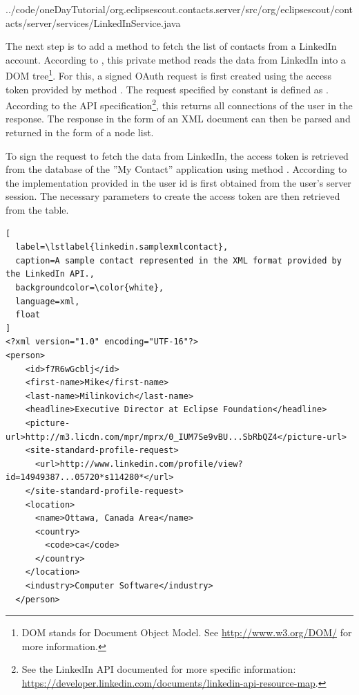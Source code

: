 \documentclass[a4paper,10pt,twoside]{book}
\begin{document}

{../code/oneDayTutorial/org.eclipsescout.contacts.server/src/org/eclipsescout/contacts/server/services/LinkedInService.java}

The next step is to add a method  to fetch the list of contacts from a LinkedIn account. 
According to , this private  method reads the data from LinkedIn into a DOM tree\footnote{
DOM stands for Document Object Model. See \url{http://www.w3.org/DOM/} for more information.
}. 
For this, a signed OAuth request is first created using the access token provided by method . 
The request specified by constant  is defined as . 
According to the API specification\footnote{
See the LinkedIn API documented for more specific information: \url{https://developer.linkedin.com/documents/linkedin-api-resource-map}.
}, 
this returns all connections of the user in the response. 
The response in the form of an XML document can then be parsed and returned in the form of a node list. 

To sign the request to fetch the data from LinkedIn, the access token is retrieved from the database of the ''My Contact'' application using method . 
According to the implementation provided in  the user id is first obtained from the user's server session. 
The necessary parameters to create the access token are then retrieved from the  table. 

\begin{lstlisting}[
  label=\lstlabel{linkedin.samplexmlcontact},
  caption=A sample contact represented in the XML format provided by the LinkedIn API.,
  backgroundcolor=\color{white},
  language=xml,
  float
]
<?xml version="1.0" encoding="UTF-16"?>
<person>
    <id>f7R6wGcblj</id>
    <first-name>Mike</first-name>
    <last-name>Milinkovich</last-name>
    <headline>Executive Director at Eclipse Foundation</headline>
    <picture-url>http://m3.licdn.com/mpr/mprx/0_IUM7Se9vBU...SbRbQZ4</picture-url>
    <site-standard-profile-request>
      <url>http://www.linkedin.com/profile/view?id=14949387...05720*s114280*</url>
    </site-standard-profile-request>
    <location>
      <name>Ottawa, Canada Area</name>
      <country>
        <code>ca</code>
      </country>
    </location>
    <industry>Computer Software</industry>
  </person>
\end{lstlisting}
\end{document}
